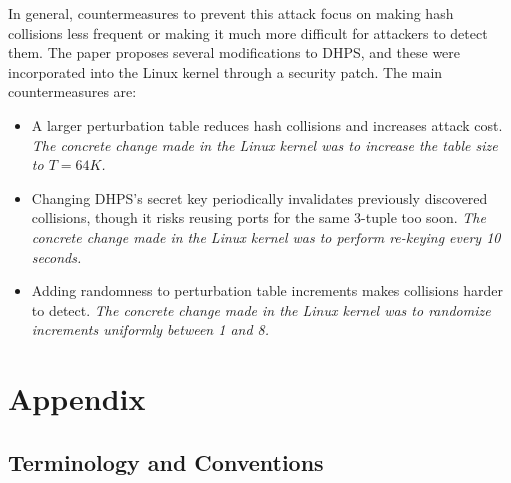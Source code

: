 \documentclass[twocolumn]{report}
\begin{document}
In \alert{general}, \alert{countermeasures} to prevent this attack focus on making hash collisions less frequent or making it much more difficult for attackers to detect them. The paper proposes several modifications to DHPS, and these were incorporated into the Linux kernel through a security patch. The main countermeasures are:
\begin{itemize}
	\item {}
	A larger perturbation table reduces hash collisions and increases attack cost.
	\textit{The concrete change made in the Linux kernel was to increase the table size to $T = 64K$.}

	\item {}
	Changing DHPS’s secret key periodically invalidates previously discovered collisions, though it risks reusing ports for the same 3-tuple too soon.
	\textit{The concrete change made in the Linux kernel was to perform re-keying every 10 seconds.}

	\item {}
	Adding randomness to perturbation table increments makes collisions harder to detect.
	\textit{The concrete change made in the Linux kernel was to randomize increments uniformly between 1 and 8.}
\end{itemize}

\section{Appendix}
\label{sec:appendix}

\subsection{Terminology and Conventions}
\label{sec:terminology and conventions}
\end{document}
